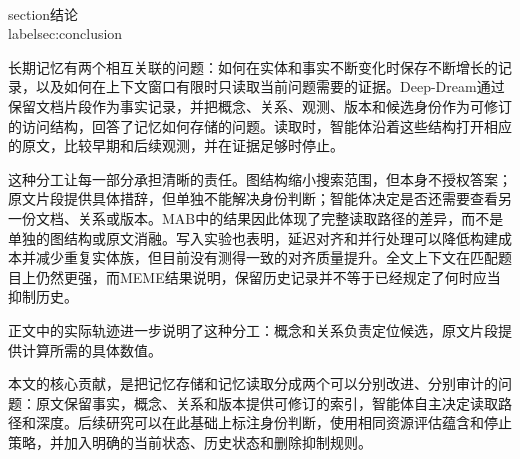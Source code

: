 \\section{结论}
\\label{sec:conclusion}

长期记忆有两个相互关联的问题：如何在实体和事实不断变化时保存不断增长的记录，以及如何在上下文窗口有限时只读取当前问题需要的证据。Deep-Dream通过保留文档片段作为事实记录，并把概念、关系、观测、版本和候选身份作为可修订的访问结构，回答了记忆如何存储的问题。读取时，智能体沿着这些结构打开相应的原文，比较早期和后续观测，并在证据足够时停止。

这种分工让每一部分承担清晰的责任。图结构缩小搜索范围，但本身不授权答案；原文片段提供具体措辞，但单独不能解决身份判断；智能体决定是否还需要查看另一份文档、关系或版本。MAB中的结果因此体现了完整读取路径的差异，而不是单独的图结构或原文消融。写入实验也表明，延迟对齐和并行处理可以降低构建成本并减少重复实体族，但目前没有测得一致的对齐质量提升。全文上下文在匹配题目上仍然更强，而MEME结果说明，保留历史记录并不等于已经规定了何时应当抑制历史。

正文中的实际轨迹进一步说明了这种分工：概念和关系负责定位候选，原文片段提供计算所需的具体数值。

本文的核心贡献，是把记忆存储和记忆读取分成两个可以分别改进、分别审计的问题：原文保留事实，概念、关系和版本提供可修订的索引，智能体自主决定读取路径和深度。后续研究可以在此基础上标注身份判断，使用相同资源评估蕴含和停止策略，并加入明确的当前状态、历史状态和删除抑制规则。
